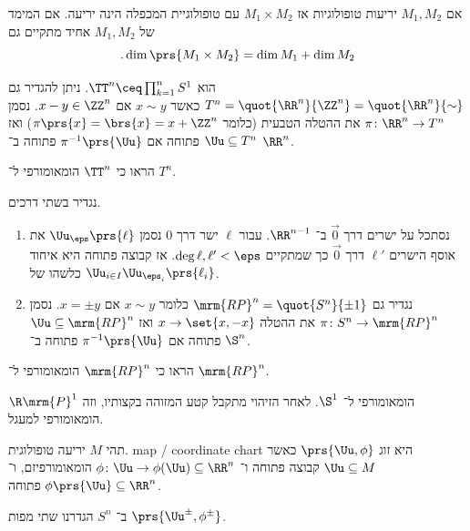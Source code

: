 \documentclass[a4paper,10pt,twoside,openany]{book}
\begin{document}
\begin{exercise}
אם
$M_1, M_2$
יריעות טופולוגיות אז
$M_1 \times M_2$
עם טופולוגיית המכפלה הינה יריעה.
אם המימד של
$M_1, M_2$
אחיד מתקיים גם
\[\text{.} \dim\prs{M_1 \times M_2} = \dim{M_1} + \dim{M_2}\]
\end{exercise}
\begin{example}
 הוא
$\TT^n \ceq \prod_{k=1}^n S^1$.
ניתן להגדיר גם
$T^n = \quot{\RR^n}{\ZZ^n} = \quot{\RR^n}{\sim}$
כאשר
$x \sim y$
אם
$x-y \in \ZZ^n$.
נסמן
$\pi \colon \RR^n \to T^n$
את ההטלה הטבעית (כלומר
$\pi\prs{x} = \brs{x} = x+\ZZ^n$)
ואז
$\Uu \subseteq T^n$
פתוחה אם
$\pi^{-1}\prs{\Uu}$
פתוחה ב־%
$\RR^n$.
\end{example}
\begin{exercise}
הראו כי
$\TT^n$
הומאומורפי ל־%
$T^n$.
\end{exercise}
\begin{example}
נגדיר
בשתי דרכים.
\begin{enumerate}[label = (\roman*)]
\item
נסתכל על ישרים דרך
$\vec{0}$
ב־%
$\RR^{n-1}$.
עבור
$\ell$
ישר דרך
$0$
נסמן
$\Uu_{\eps}\prs{\ell}$
את אוסף הישרים
$\ell'$
דרך
$\vec{0}$
כך שמתקיים
$\deg{\ell, \ell'} < \eps$.
אז קבוצה פתוחה היא איחוד כלשהו של
$\Uu_{i\in I} \Uu_{\eps_i}\prs{\ell_i}$.
\item
נגדיר גם
$\mrm{RP}^n = \quot{S^n}{\pm 1}$
כלומר
$x \sim y$
אם
$x = \pm y$.
נסמן
$\pi \colon S^n \to \mrm{RP}^n$
את ההטלה
$x \to \set{x, -x}$
ואז
$\Uu \subseteq \mrm{RP}^n$
פתוחה אם
$\pi^{-1}\prs{\Uu}$
פתוחה ב־%
$\S^n$.
\end{enumerate}
\end{example}
\begin{exercise}
הראו כי
$\mrm{RP}^n$
הומאומורפי ל־%
$\mrm{RP}^n$.
\end{exercise}
\begin{example}
$\R \mrm{P}^1$
הומאומורפי ל־%
$\S^1$.
לאחר הזיהוי מתקבל קטע המזוהה בקצותיו, וזה הומאומורפי למעגל.
\end{example}
\begin{definition}
תהי
$M$
יריעה טופולוגית.
\textenglish{map / coordinate chart}
היא זוג
$\prs{\Uu, \phi}$
כאשר
$\Uu \subseteq M$
קבוצה פתוחה ו־%
$\phi \colon \Uu \to \phi(\Uu) \subseteq \RR^n$
הומאומורפיזם, ו־%
$\phi\prs{\Uu} \subseteq \RR^n$
פתוחה.
\end{definition}
\begin{example}
ב־%
$S^n$
הגדרנו שתי מפות
$\prs{\Uu^{\pm}, \phi^{\pm}}$.
\end{example}
\end{document}
